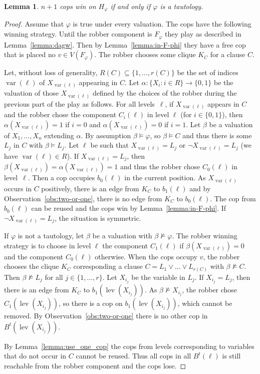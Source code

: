 \documentclass[authoryear]{article}
\newtheorem{lemma}[theorem]{Lemma}
\theoremstyle{definition}
\DeclareMathOperator{\var}{var}
\DeclareMathOperator{\lev}{lev}
\renewcommand{\mid}{\ensuremath{:}}
\renewcommand{\phi}{\varphi}
\newcommand{\0}{\emptyset}
\begin{document}
\begin{lemma}\label{lemma:tautology}
  $n+1$ cops win on $H_\phi$ if and only if $\phi$ is a tautology.
\end{lemma} 
\begin{proof}
  Assume that $\phi$ is true under every valuation. The cops have the following
  winning strategy. Until the robber component is $F_\phi$ they play as
  described in Lemma~\ref{lemma:dagw}. Then by Lemma~\ref{lemma:in-F-phi} they
  have a free cop that is placed no $v\in V(F_\phi)$. The robber chooses some
  clique $K_C$ for a clause $C$.

  Let, without loss of generality, $R(C)\subseteq \{1,\ldots,r(C)\}$ be the set
  of indices~$\var(\ell)$ of $X_{\var(\ell)}$ appearing in $C$. Let
  $\alpha\colon \{X_i \mid i\in R\} \to \{0,1\}$ be the valuation of those
  $X_{\var(\ell)}$ defined by the choices of the robber during the previous part
  of the play as follows. For all levels~$\ell$, if $X_{\var(\ell)}$ appears in
  $C$ and the robber chose the component $C_i(\ell)$ in level $\ell$ (for
  $i\in\{0,1\}$), then $\alpha(X_{\var(\ell)}) = 1$ if $i=0$ and
  $\alpha(X_{\var(\ell)}) = 0$ if $i=1$. Let $\beta$ be a valuation of
  $X_1,\ldots,X_n$ extending $\alpha$. By assumption $\beta \models \phi$, so
  $\beta\models C$ and thus there is some $L_j$ in $C$ with $\beta \models L_j$.
  Let $\ell$ be such that $X_{\var(\ell)} = L_j$ or $\neg X_{\var(\ell)} = L_j$
  (we have $\var(\ell)\in R$). If $X_{\var(\ell)} = L_j$, then
  $\beta(X_{\var(\ell)}) = \alpha(X_{\var(\ell)}) = 1$ and thus the robber chose
  $C_0(\ell)$ in level~$\ell$. Then a cop occupies $b_0(\ell)$ in the current
  position. As $X_{\var(\ell)}$ occurs in $C$ positively, there is an edge from
  $K_C$ to $b_1(\ell)$ and by Observation~\ref{obs:two-or-one}, there is no edge
  from $K_C$ to $b_0(\ell)$. The cop from $b_0(\ell)$ can be reused and the cops
  win by Lemma~\ref{lemma:in-F-phi}. If $\neg X_{\var(\ell)} = L_j$, the situation is symmetric.

  If $\phi$ is not a tautology, let $\beta$ be a valuation with
  $\beta \not\models \phi$. The robber winning strategy is to choose in level
  $\ell$ the component $C_1(\ell)$ if $\beta(X_{\var(\ell)}) = 0$ and the
  component $C_0(\ell)$ otherwise. When the cops occupy $v$, the robber chooses
  the clique $K_C$ corresponding a clause $C = L_1 \lor{} \ldots {}\lor L_{r(C)}$ with
  $\beta \not \models C$. Then $\beta \not \models L_j$ for all
  $j\in\{1,\ldots,r\}$. Let $X_{i_j}$ be the variable in $L_j$. If
  $X_{i_j} = L_j$, then there is an edge from $K_C$ to $b_1(\lev(X_{i_j}))$. As
  $\beta\not\models X_{i_j}$, the robber chose $C_1(\lev(X_{i_j}))$, so there is
  a cop on $b_1(\lev(X_{i_j}))$, which cannot be removed. By
  Observation~\ref{obs:two-or-one} there is no other cop in
  $B^t(\lev(X_{i_j}))$. 

  By Lemma~\ref{lemma:use_one_cop} the cops from levels corresponding to
  variables that do not occur in $C$ cannot be reused. Thus all cops in all
  $B^t(\ell)$ is still reachable from the robber component and the cops lose.
\end{proof}
\end{document}
